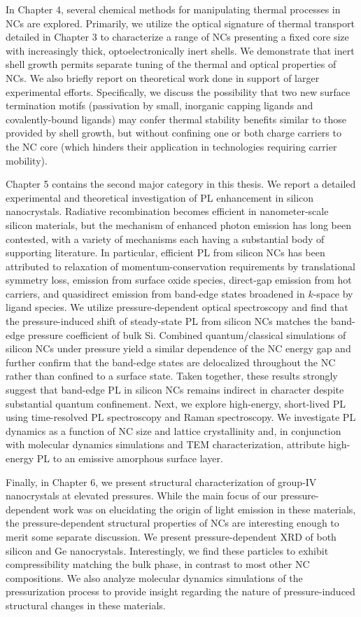 In Chapter 4, several chemical methods for manipulating thermal processes in NCs are explored. Primarily, we utilize the optical signature of thermal transport detailed in Chapter 3 to characterize a range of NCs presenting a fixed core size with increasingly thick, optoelectronically inert shells. We demonstrate that inert shell growth permits separate tuning of the thermal and optical properties of NCs. We also briefly report on theoretical work done in support of larger experimental efforts. Specifically, we discuss the possibility that two new surface termination motifs (passivation by small, inorganic capping ligands and covalently-bound ligands) may confer thermal stability benefits similar to those provided by shell growth, but without confining one or both charge carriers to the NC core (which hinders their application in technologies requiring carrier mobility). \par
Chapter 5 contains the second major category in this thesis. We report a detailed experimental and theoretical investigation of PL enhancement in silicon nanocrystals. Radiative recombination becomes efficient in nanometer-scale silicon materials, but the mechanism of enhanced photon emission has long been contested, with a variety of mechanisms each having a substantial body of supporting literature. In particular, efficient PL from silicon NCs has been attributed to relaxation of momentum-conservation requirements by translational symmetry loss, emission from surface oxide species, direct-gap emission from hot carriers, and quasidirect emission from band-edge states broadened in $k$-space by ligand species. We utilize pressure-dependent optical spectroscopy and find that the pressure-induced shift of steady-state PL from silicon NCs matches the band-edge pressure coefficient of bulk Si. Combined quantum/classical simulations of silicon NCs under pressure yield a similar dependence of the NC energy gap and further confirm that the band-edge states are delocalized throughout the NC rather than confined to a surface state. Taken together, these results strongly suggest that band-edge PL in silicon NCs remains indirect in character despite substantial quantum confinement. Next, we explore high-energy, short-lived PL using time-resolved PL spectroscopy and Raman spectroscopy. We investigate PL dynamics as a function of NC size and lattice crystallinity and, in conjunction with molecular dynamics simulations and TEM characterization, attribute high-energy PL to an emissive amorphous surface layer. \par
Finally, in Chapter 6, we present structural characterization of group-IV nanocrystals at elevated pressures. While the main focus of our pressure-dependent work was on elucidating the origin of light emission in these materials, the pressure-dependent structural properties of NCs are interesting enough to merit some separate discussion. We present pressure-dependent XRD of both silicon and Ge nanocrystals. Interestingly, we find these particles to exhibit compressibility matching the bulk phase, in contrast to most other NC compositions. We also analyze molecular dynamics simulations of the pressurization process to provide insight regarding the nature of pressure-induced structural changes in these materials.